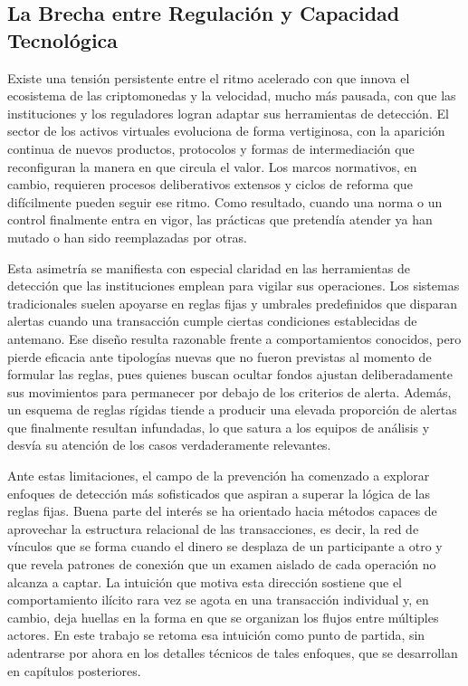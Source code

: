 \subsection{La Brecha entre Regulación y Capacidad Tecnológica}

Existe una tensión persistente entre el ritmo acelerado con que innova el ecosistema de las criptomonedas y la velocidad, mucho más pausada, con que las instituciones y los reguladores logran adaptar sus herramientas de detección. El sector de los activos virtuales evoluciona de forma vertiginosa, con la aparición continua de nuevos productos, protocolos y formas de intermediación que reconfiguran la manera en que circula el valor. Los marcos normativos, en cambio, requieren procesos deliberativos extensos y ciclos de reforma que difícilmente pueden seguir ese ritmo. Como resultado, cuando una norma o un control finalmente entra en vigor, las prácticas que pretendía atender ya han mutado o han sido reemplazadas por otras.

Esta asimetría se manifiesta con especial claridad en las herramientas de detección que las instituciones emplean para vigilar sus operaciones. Los sistemas tradicionales suelen apoyarse en reglas fijas y umbrales predefinidos que disparan alertas cuando una transacción cumple ciertas condiciones establecidas de antemano. Ese diseño resulta razonable frente a comportamientos conocidos, pero pierde eficacia ante tipologías nuevas que no fueron previstas al momento de formular las reglas, pues quienes buscan ocultar fondos ajustan deliberadamente sus movimientos para permanecer por debajo de los criterios de alerta. Además, un esquema de reglas rígidas tiende a producir una elevada proporción de alertas que finalmente resultan infundadas, lo que satura a los equipos de análisis y desvía su atención de los casos verdaderamente relevantes.

Ante estas limitaciones, el campo de la prevención ha comenzado a explorar enfoques de detección más sofisticados que aspiran a superar la lógica de las reglas fijas. Buena parte del interés se ha orientado hacia métodos capaces de aprovechar la estructura relacional de las transacciones, es decir, la red de vínculos que se forma cuando el dinero se desplaza de un participante a otro y que revela patrones de conexión que un examen aislado de cada operación no alcanza a captar. La intuición que motiva esta dirección sostiene que el comportamiento ilícito rara vez se agota en una transacción individual y, en cambio, deja huellas en la forma en que se organizan los flujos entre múltiples actores. En este trabajo se retoma esa intuición como punto de partida, sin adentrarse por ahora en los detalles técnicos de tales enfoques, que se desarrollan en capítulos posteriores.

